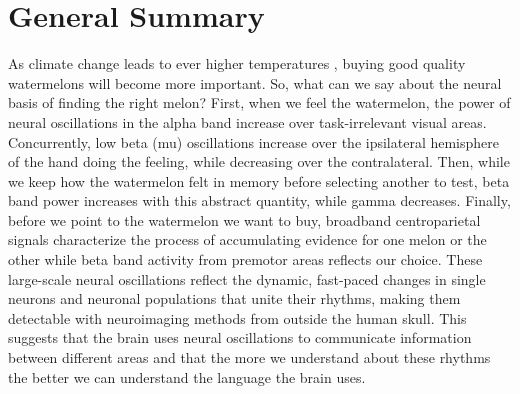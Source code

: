 \section{General Summary}
As climate change leads to ever higher temperatures \parencite{Parmesan2003}, buying good quality watermelons will become more important. So, what can we say about the neural basis of finding the right melon? First, when we feel the watermelon, the power of neural oscillations in the alpha band increase over task-irrelevant visual areas. Concurrently, low beta (mu) oscillations increase over the ipsilateral hemisphere of the hand doing the feeling, while decreasing over the contralateral. Then, while we keep how the watermelon felt in memory before selecting another to test, beta band power increases with this abstract quantity, while gamma decreases. Finally, before we point to the watermelon we want to buy, broadband centroparietal signals characterize the process of accumulating evidence for one melon or the other while beta band activity from premotor areas reflects our choice. These large-scale neural oscillations reflect the dynamic, fast-paced changes in single neurons and neuronal populations that unite their rhythms, making them detectable with neuroimaging methods from outside the human skull. This suggests that the brain uses neural oscillations to communicate information between different areas and that the more we understand about these rhythms the better we can understand the language the brain uses.